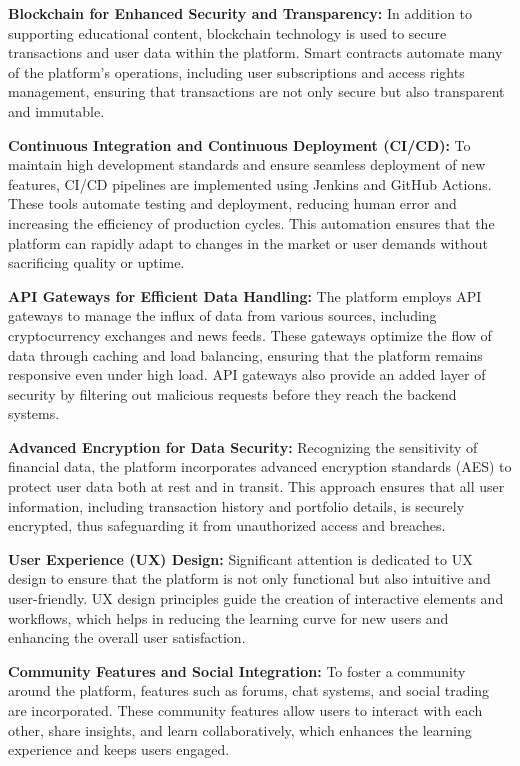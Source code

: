 \documentclass[12pt]{report}
\begin{document}
\textbf{Blockchain for Enhanced Security and Transparency:} In addition to supporting educational content, blockchain technology is used to secure transactions and user data within the platform. Smart contracts automate many of the platform's operations, including user subscriptions and access rights management, ensuring that transactions are not only secure but also transparent and immutable.

\textbf{Continuous Integration and Continuous Deployment (CI/CD):} To maintain high development standards and ensure seamless deployment of new features, CI/CD pipelines are implemented using Jenkins and GitHub Actions. These tools automate testing and deployment, reducing human error and increasing the efficiency of production cycles. This automation ensures that the platform can rapidly adapt to changes in the market or user demands without sacrificing quality or uptime.

\textbf{API Gateways for Efficient Data Handling:} The platform employs API gateways to manage the influx of data from various sources, including cryptocurrency exchanges and news feeds. These gateways optimize the flow of data through caching and load balancing, ensuring that the platform remains responsive even under high load. API gateways also provide an added layer of security by filtering out malicious requests before they reach the backend systems.

\textbf{Advanced Encryption for Data Security:} Recognizing the sensitivity of financial data, the platform incorporates advanced encryption standards (AES) to protect user data both at rest and in transit. This approach ensures that all user information, including transaction history and portfolio details, is securely encrypted, thus safeguarding it from unauthorized access and breaches.

\textbf{User Experience (UX) Design:} Significant attention is dedicated to UX design to ensure that the platform is not only functional but also intuitive and user-friendly. UX design principles guide the creation of interactive elements and workflows, which helps in reducing the learning curve for new users and enhancing the overall user satisfaction.

\textbf{Community Features and Social Integration:} To foster a community around the platform, features such as forums, chat systems, and social trading are incorporated. These community features allow users to interact with each other, share insights, and learn collaboratively, which enhances the learning experience and keeps users engaged.
\end{document}
